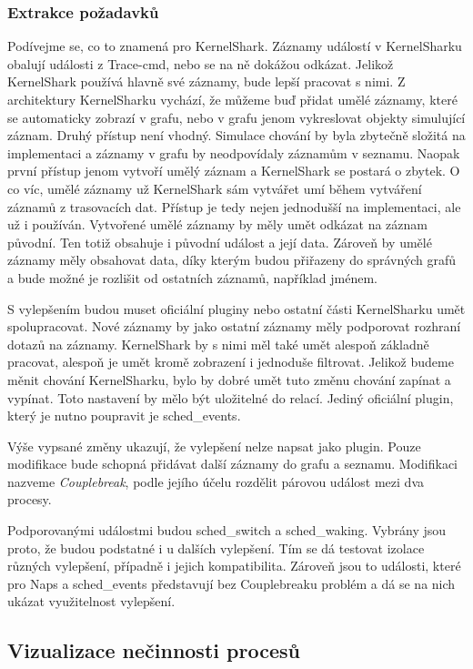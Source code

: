 \subsubsection*{Extrakce požadavků}
Podívejme se, co to znamená pro KernelShark. Záznamy událostí v KernelSharku obalují události z Trace-cmd, nebo se na ně dokážou odkázat. Jelikož KernelShark používá hlavně své záznamy, bude lepší pracovat s nimi. Z architektury KernelSharku vychází, že můžeme buď přidat umělé záznamy, které se automaticky zobrazí v grafu, nebo v grafu jenom vykreslovat objekty simulující záznam. Druhý přístup není vhodný. Simulace chování by byla zbytečně složitá na implementaci a záznamy v grafu by neodpovídaly záznamům v seznamu. Naopak první přístup jenom vytvoří umělý záznam a KernelShark se postará o zbytek. O co víc, umělé záznamy už KernelShark sám vytvářet umí během vytváření záznamů z trasovacích dat. Přístup je tedy nejen jednodušší na implementaci, ale už i používán. Vytvořené umělé záznamy by měly umět odkázat na záznam původní. Ten totiž obsahuje i původní událost a její data. Zároveň by umělé záznamy měly obsahovat data, díky kterým budou přiřazeny do správných grafů a bude možné je rozlišit od ostatních záznamů, například jménem.

S vylepšením budou muset oficiální pluginy nebo ostatní části KernelSharku umět spolupracovat. Nové záznamy by jako ostatní záznamy měly podporovat rozhraní dotazů na záznamy. KernelShark by s nimi měl také umět alespoň základně pracovat, alespoň je umět kromě zobrazení i jednoduše filtrovat. Jelikož budeme měnit chování KernelSharku, bylo by dobré umět tuto změnu chování zapínat a vypínat. Toto nastavení by mělo být uložitelné do relací. Jediný oficiální plugin, který je nutno poupravit je sched\_events.

Výše vypsané změny ukazují, že vylepšení nelze napsat jako plugin. Pouze modifikace bude schopná přidávat další záznamy do grafu a seznamu. Modifikaci nazveme \emph{Couplebreak}, podle jejího účelu rozdělit párovou událost mezi dva procesy.

Podporovanými událostmi budou sched\_switch a sched\_waking. Vybrány jsou proto, že budou podstatné i u dalších vylepšení. Tím se dá testovat izolace různých vylepšení, případně i jejich kompatibilita. Zároveň jsou to události, které pro Naps a sched\_events představují bez Couplebreaku problém a dá se na nich ukázat využitelnost vylepšení.

\subsection{Vizualizace nečinnosti procesů}

